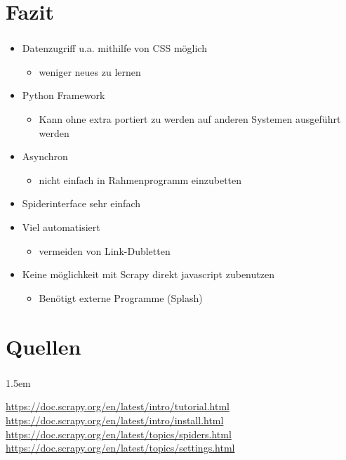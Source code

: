 \documentclass{beamer}
\begin{document}
\section{Fazit}
\begin{frame}
	\frametitle{\insertsection{}}
	\begin{itemize}
	  \item Datenzugriff u.a. mithilfe von CSS möglich \begin{itemize} 
			\item weniger neues zu lernen \end{itemize}
	  \item Python Framework \begin{itemize} 
			\item Kann ohne extra portiert zu werden auf anderen Systemen ausgeführt
			werden \end{itemize}
	  \item Asynchron \begin{itemize} 
			\item nicht einfach in Rahmenprogramm einzubetten \end{itemize}
	  \item Spiderinterface sehr einfach
	  \item Viel automatisiert \begin{itemize} 
			\item vermeiden von Link-Dubletten \end{itemize}
	  \item Keine möglichkeit mit Scrapy direkt javascript zubenutzen
	  \begin{itemize}
			\item Benötigt externe Programme (Splash) \end{itemize}
	\end{itemize}
\end{frame}


\section{Quellen}
\begin{frame}
	\frametitle{\insertsection{}}
	\emergencystretch 1.5em
	{\small
	\begin{thebibliography}{8}
		\url{https://doc.scrapy.org/en/latest/intro/tutorial.html}
		\url{https://doc.scrapy.org/en/latest/intro/install.html}
		\url{https://doc.scrapy.org/en/latest/topics/spiders.html}
		\url{https://doc.scrapy.org/en/latest/topics/settings.html}
	\end{thebibliography}
	}
\end{frame}
\end{document}
